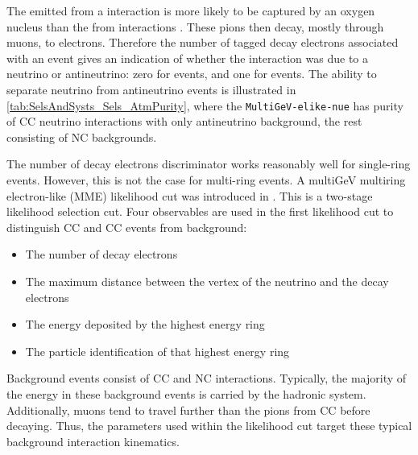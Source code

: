 The \quickmath{\pi^{-}} emitted from a  interaction is more likely to be captured by an oxygen nucleus than the \quickmath{\pi^{+}} from  interactions \cite{LeeKaPik}. These pions then decay, mostly through muons, to electrons. Therefore the number of tagged decay electrons associated with an event gives an indication of whether the interaction was due to a neutrino or antineutrino: zero for  events, and one for  events. The ability to separate neutrino from antineutrino events is illustrated in \autoref{tab:SelsAndSysts_Sels_AtmPurity}, where the \texttt{MultiGeV-elike-nue} has  purity of CC neutrino interactions with only  antineutrino background, the rest consisting of NC backgrounds.

The number of decay electrons discriminator works reasonably well for single-ring events. However, this is not the case for multi-ring events. A multiGeV multiring electron-like (MME) likelihood cut was introduced in \cite{PhysRevD.81.092004, PhysRevD.74.032002}. This is a two-stage likelihood selection cut. Four observables are used in the first likelihood cut to distinguish CC and CC events from background:

\begin{itemize}
\item The number of decay electrons
\item The maximum distance between the vertex of the neutrino and the decay electrons
\item The energy deposited by the highest energy ring
\item The particle identification of that highest energy ring
\end{itemize}

Background events consist of CC\quickmath{\nu_{\mu}} and NC interactions. Typically, the majority of the energy in these background events is carried by the hadronic system. Additionally, muons tend to travel further than the pions from CC before decaying. Thus, the parameters used within the likelihood cut target these typical background interaction kinematics.


